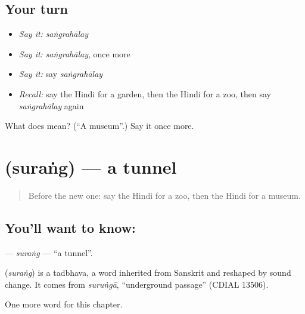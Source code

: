 \subsection*{Your turn}
\begin{itemize}
\raggedright
  \item \emph{Say it:} \emph{saṅgrahālay}
  \item \emph{Say it:} \emph{saṅgrahālay}, once more
  \item \emph{Say it:} say \emph{saṅgrahālay}
  \item \emph{Recall:} say the Hindi for a garden, then the Hindi for a zoo, then say \emph{saṅgrahālay} again
\end{itemize}

\begin{tcolorbox}[breakable,colback=teal!4,colframe=teal!35!black,title={Before you move on}]
What does  mean? (\textquotedblleft{}A museum\textquotedblright{}.) Say it once more.
\end{tcolorbox}
\section[\texorpdfstring{\hi{सुरंग} (suraṅg)}{सुरंग (suraṅg)}]{ (suraṅg) — a tunnel}

\label{lesson:HI-C203-surang}



\begin{quote}
Before the new one: say the Hindi for a zoo, then the Hindi for a museum.
\end{quote}

\subsection*{You'll want to know: }
\textbf{} — \emph{suraṅg} — \textquotedblleft{}a tunnel\textquotedblright{}.

\begin{cousinweb}
\textbf{} (\emph{suraṅg}) is a tadbhava, a word inherited from Sanskrit and reshaped by sound change. It comes from \emph{suruṅgā}, \textquotedblleft{}underground passage\textquotedblright{} (CDIAL 13506).
\end{cousinweb}

\begin{grammarlens}[title={What you've built}]
One more word for this chapter.
\end{grammarlens}

